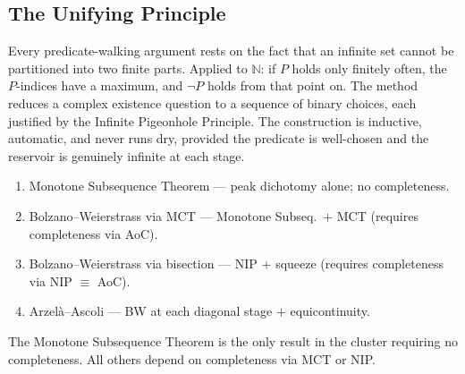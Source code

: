 \subsection*{The Unifying Principle}

\begin{remark}
Every predicate-walking argument rests on the fact that an infinite set
cannot be partitioned into two finite parts. Applied to $\mathbb{N}$: if
$P$ holds only finitely often, the $P$-indices have a maximum, and $\neg P$
holds from that point on. The method reduces a complex existence question
to a sequence of binary choices, each justified by the Infinite Pigeonhole
Principle. The construction is inductive, automatic, and never runs dry,
provided the predicate is well-chosen and the reservoir is genuinely infinite
at each stage.
\end{remark}

\begin{remark}
\begin{enumerate}
  \item Monotone Subsequence Theorem --- peak dichotomy alone; no completeness.
  \item Bolzano--Weierstrass via MCT --- Monotone Subseq.\ $+$ MCT (requires
        completeness via AoC).
  \item Bolzano--Weierstrass via bisection --- NIP $+$ squeeze (requires
        completeness via NIP $\equiv$ AoC).
  \item Arzel\`a--Ascoli --- BW at each diagonal stage $+$ equicontinuity.
\end{enumerate}
The Monotone Subsequence Theorem is the only result in the cluster requiring
no completeness. All others depend on completeness via MCT or NIP.
\end{remark}
